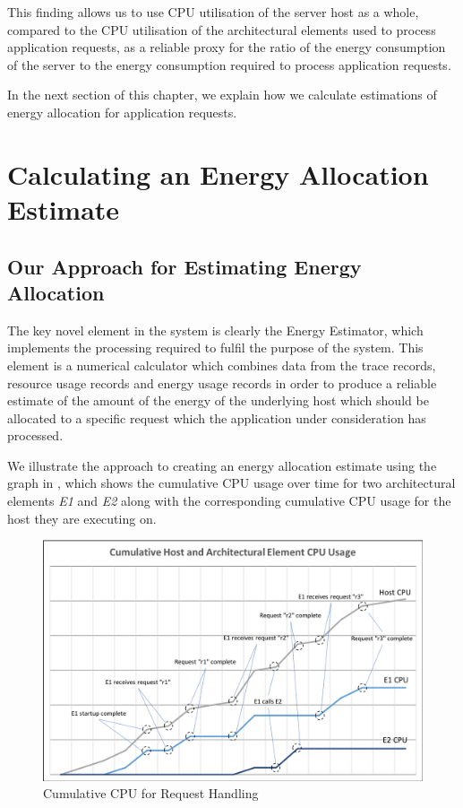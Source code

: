 This finding allows us to use CPU utilisation of the server host as a whole, compared to the CPU utilisation of the architectural elements used to process application requests, as a reliable proxy for the ratio of the energy consumption of the server to the energy consumption required to process application requests.

In the next section of this chapter, we explain how we calculate estimations of energy allocation for application requests.

\section{Calculating an Energy Allocation Estimate}

\subsection{Our Approach for Estimating Energy Allocation}

The key novel element in the system is clearly the Energy Estimator, which implements the processing required to fulfil the purpose of the system.  This element is a numerical calculator which combines data from the trace records, resource usage records and energy usage records in order to produce a reliable estimate of the amount of the energy of the underlying host which should be allocated to a specific request which the application under consideration has processed.

We illustrate the approach to creating an energy allocation estimate using the graph in , which shows the cumulative CPU usage over time for two architectural elements \emph{E1} and \emph{E2} along with the corresponding cumulative CPU usage for the host they are executing on.

\begin{figure}
\centering
\includegraphics[width=1.0\textwidth,trim={2 2 2 2},clip]{Figures/estimating-energy-cpuusage}
\caption{Cumulative CPU for Request Handling}
\label{figure:cpuusage}
\end{figure}

